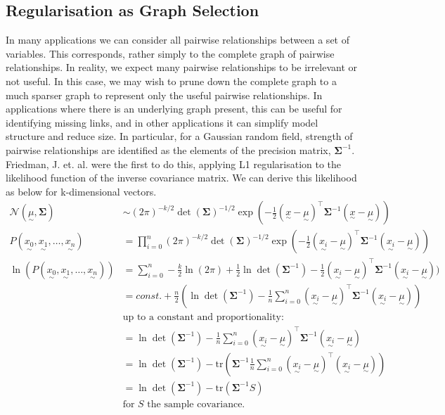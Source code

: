 \documentclass[12pt,a4paper]{article} %
\newcommand{\ve}[1]{\underset{\sim}{#1}}
\begin{document}
\subsection{Regularisation as Graph Selection}
In many applications we can consider all pairwise relationships between a set of variables. This corresponds, rather simply to the complete graph of pairwise relationships. In reality, we expect many pairwise relationships to be irrelevant or not useful. In this case, we may wish to prune down the complete graph to a much sparser graph to represent only the useful pairwise relationships. In applications where there is an underlying graph present, this can be useful for identifying missing links, and in other applications it can simplify model structure and reduce size. In particular, for a Gaussian random field, strength of pairwise relationships are identified as the elements of the precision matrix, $\pmb{\Sigma}^{-1}$. Friedman, J. et. al. \cite{friedmanglasso} were the first to do this, applying L1 regularisation to the likelihood function of the inverse covariance matrix. We can derive this likelihood as below for k-dimensional vectors.
\begin{align*}
    \mathcal{N}(\ve{\mu},\pmb{\Sigma})&\sim(2\pi)^{-k/2}\det(\pmb{\Sigma})^{-1/2}\exp(-\frac12 (\ve{x}-\ve{\mu})^\top\pmb{\Sigma}^{-1}(\ve{x}-\ve{\mu}))\\
    P(\ve{x_0},\ve{x_1},\dots,{\ve{x_n}})&=\prod_{i=0}^n(2\pi)^{-k/2}\det(\pmb{\Sigma})^{-1/2}\exp(-\frac12 (\ve{x_i}-\ve{\mu})^\top\pmb{\Sigma}^{-1}(\ve{x_i}-\ve{\mu}))\\
    \ln(P(\ve{x_0},\ve{x_1},\dots,{\ve{x_n}}))&=\sum_{i=0}^n -\frac{k}{2}\ln(2\pi)+\frac12\ln\det(\pmb{\Sigma}^{-1})-\frac12(\ve{x_i}-\ve{\mu})^\top\pmb{\Sigma}^{-1}(\ve{x_i}-\ve{\mu}))\\
    &=const.+\frac{n}{2}(\ln\det(\pmb{\Sigma}^{-1})-\frac{1}{n}\sum_{i=0}^n(\ve{x_i}-\ve{\mu})^\top\pmb{\Sigma}^{-1}(\ve{x_i}-\ve{\mu}))\\
    &\text{up to a constant and proportionality:}\\
    &=\ln\det(\pmb{\Sigma}^{-1})-\frac{1}{n}\sum_{i=0}^n(\ve{x_i}-\ve{\mu})^\top\pmb{\Sigma}^{-1}(\ve{x_i}-\ve{\mu})\\
    &=\ln\det(\pmb{\Sigma}^{-1})-\text{tr}(\pmb{\Sigma}^{-1}\frac{1}{n}\sum_{i=0}^n(\ve{x_i}-\ve{\mu})^\top(\ve{x_i}-\ve{\mu}))\\
    &=\ln\det(\pmb{\Sigma}^{-1})-\text{tr}(\pmb{\Sigma}^{-1}S)\\
    &\text{for }S\text{ the sample covariance.}
\end{align*}
\end{document}
